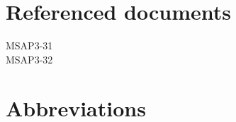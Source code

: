 \documentclass[a4paper, oneside, 11pt, article, english]{memoir}
\begin{document}
\section{Referenced documents}
\label{sec:docs}

MSAP3-31\\
MSAP3-32



\begin{description}
  \firmlist
\end{description}


\section{Abbreviations}
\label{sec:abbrev}

\end{document}
